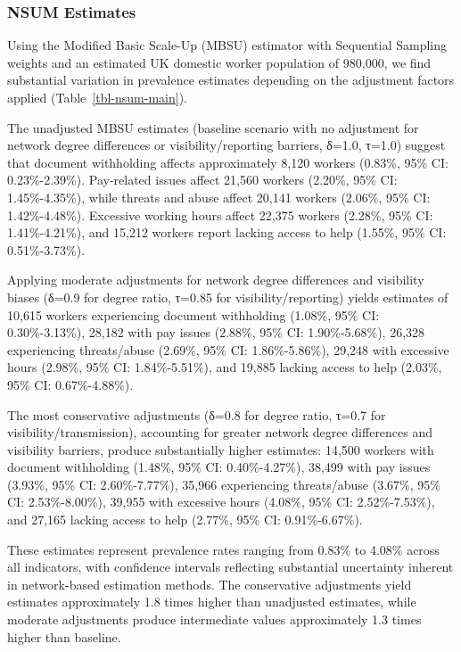 \documentclass[
  12pt,
  letterpaper,
  DIV=11,
  numbers=noendperiod]{scrartcl}
\theoremstyle{plain}
\theoremstyle{definition}
\begin{document}
\subsubsection{NSUM Estimates}\label{nsum-estimates}

Using the Modified Basic Scale-Up (MBSU) estimator
\textcite{feeh16-generalizing} with Sequential Sampling weights and an
estimated UK domestic worker population of 980,000, we find substantial
variation in prevalence estimates depending on the adjustment factors
applied (Table~\ref{tbl-nsum-main}).

The unadjusted MBSU estimates (baseline scenario with no adjustment for
network degree differences or visibility/reporting barriers, δ=1.0,
τ=1.0) suggest that document withholding affects approximately 8,120
workers (0.83\%, 95\% CI: 0.23\%-2.39\%). Pay-related issues affect
21,560 workers (2.20\%, 95\% CI: 1.45\%-4.35\%), while threats and abuse
affect 20,141 workers (2.06\%, 95\% CI: 1.42\%-4.48\%). Excessive
working hours affect 22,375 workers (2.28\%, 95\% CI: 1.41\%-4.21\%),
and 15,212 workers report lacking access to help (1.55\%, 95\% CI:
0.51\%-3.73\%).

Applying moderate adjustments for network degree differences and
visibility biases (δ=0.9 for degree ratio, τ=0.85 for
visibility/reporting) yields estimates of 10,615 workers experiencing
document withholding (1.08\%, 95\% CI: 0.30\%-3.13\%), 28,182 with pay
issues (2.88\%, 95\% CI: 1.90\%-5.68\%), 26,328 experiencing
threats/abuse (2.69\%, 95\% CI: 1.86\%-5.86\%), 29,248 with excessive
hours (2.98\%, 95\% CI: 1.84\%-5.51\%), and 19,885 lacking access to
help (2.03\%, 95\% CI: 0.67\%-4.88\%).

The most conservative adjustments (δ=0.8 for degree ratio, τ=0.7 for
visibility/transmission), accounting for greater network degree
differences and visibility barriers, produce substantially higher
estimates: 14,500 workers with document withholding (1.48\%, 95\% CI:
0.40\%-4.27\%), 38,499 with pay issues (3.93\%, 95\% CI: 2.60\%-7.77\%),
35,966 experiencing threats/abuse (3.67\%, 95\% CI: 2.53\%-8.00\%),
39,955 with excessive hours (4.08\%, 95\% CI: 2.52\%-7.53\%), and 27,165
lacking access to help (2.77\%, 95\% CI: 0.91\%-6.67\%).

These estimates represent prevalence rates ranging from 0.83\% to 4.08\%
across all indicators, with confidence intervals reflecting substantial
uncertainty inherent in network-based estimation methods. The
conservative adjustments yield estimates approximately 1.8 times higher
than unadjusted estimates, while moderate adjustments produce
intermediate values approximately 1.3 times higher than baseline.
\end{document}
